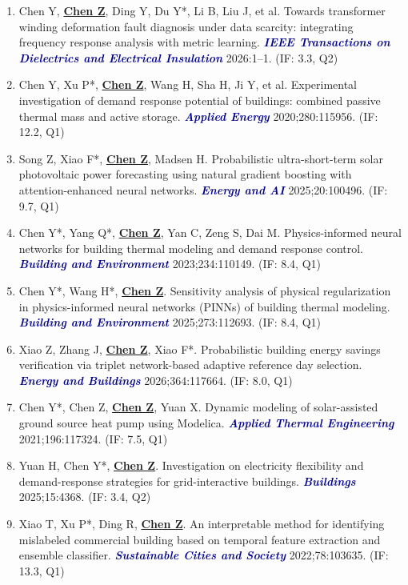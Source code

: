 \documentclass[11pt,a4paper]{article}
\newcommand{\me}[1]{\underline{\textbf{#1}}}
\newcommand{\journal}[1]{\textcolor{darkblue}{\textbf{\textit{#1}}}}
\begin{document}
\begin{enumerate}
\item Chen Y, \me{Chen Z}, Ding Y, Du Y*, Li B, Liu J, et al. Towards transformer winding deformation fault diagnosis under data scarcity: integrating frequency response analysis with metric learning. \journal{IEEE Transactions on Dielectrics and Electrical Insulation} 2026:1--1. (IF: 3.3, Q2)

\item Chen Y, Xu P*, \me{Chen Z}, Wang H, Sha H, Ji Y, et al. Experimental investigation of demand response potential of buildings: combined passive thermal mass and active storage. \journal{Applied Energy} 2020;280:115956. (IF: 12.2, Q1)

\item Song Z, Xiao F*, \me{Chen Z}, Madsen H. Probabilistic ultra-short-term solar photovoltaic power forecasting using natural gradient boosting with attention-enhanced neural networks. \journal{Energy and AI} 2025;20:100496. (IF: 9.7, Q1)

\item Chen Y*, Yang Q*, \me{Chen Z}, Yan C, Zeng S, Dai M. Physics-informed neural networks for building thermal modeling and demand response control. \journal{Building and Environment} 2023;234:110149. (IF: 8.4, Q1)

\item Chen Y*, Wang H*, \me{Chen Z}. Sensitivity analysis of physical regularization in physics-informed neural networks (PINNs) of building thermal modeling. \journal{Building and Environment} 2025;273:112693. (IF: 8.4, Q1)

\item Xiao Z, Zhang J, \me{Chen Z}, Xiao F*. Probabilistic building energy savings verification via triplet network-based adaptive reference day selection. \journal{Energy and Buildings} 2026;364:117664. (IF: 8.0, Q1)

\item Chen Y*, Chen Z, \me{Chen Z}, Yuan X. Dynamic modeling of solar-assisted ground source heat pump using Modelica. \journal{Applied Thermal Engineering} 2021;196:117324. (IF: 7.5, Q1)

\item Yuan H, Chen Y*, \me{Chen Z}. Investigation on electricity flexibility and demand-response strategies for grid-interactive buildings. \journal{Buildings} 2025;15:4368. (IF: 3.4, Q2)

\item Xiao T, Xu P*, Ding R, \me{Chen Z}. An interpretable method for identifying mislabeled commercial building based on temporal feature extraction and ensemble classifier. \journal{Sustainable Cities and Society} 2022;78:103635. (IF: 13.3, Q1)


\end{enumerate}
\end{document}
